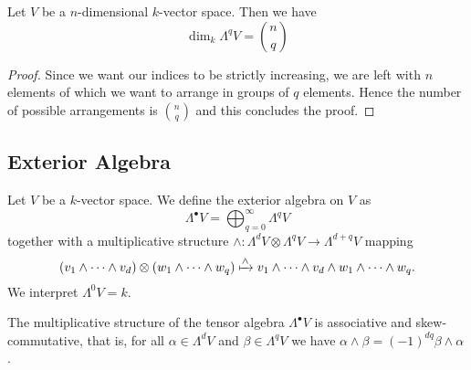 \begin{proposition}
  Let \(V\) be a \(n\)-dimensional \(k\)-vector space. Then we have
  \[
    \dim_k \Lambda^q V = \binom n q
  \]
\end{proposition}

\begin{proof}
  Since we want our indices to be strictly increasing, we are left with \(n\)
  elements of which we want to arrange in groups of \(q\) elements. Hence the
  number of possible arrangements is \(\binom n q\) and this concludes the
  proof.
\end{proof}

\subsection{Exterior Algebra}

\begin{definition}
  \label{def: exterior algebra}
  Let \(V\) be a \(k\)-vector space. We define the exterior algebra on \(V\) as
  \[
    \Lambda^\bullet V = \bigoplus_{q=0}^\infty \Lambda^q V
  \]
  together with a multiplicative structure \(\wedge: \Lambda^d V \otimes
  \Lambda^q V \to \Lambda^{d+q} V\) mapping
  \[
    (v_1 \wedge \dots \wedge v_d) \otimes (w_1 \wedge \dots \wedge w_q) \xmapsto
    \wedge v_1 \wedge \dots \wedge v_d \wedge w_1 \wedge \dots \wedge w_q.
  \]
  We interpret \(\Lambda^0 V = k\).
\end{definition}

\begin{proposition}
  The multiplicative structure of the tensor algebra \(\Lambda^\bullet V\) is
  associative and skew-commutative, that is, for all \(\alpha \in \Lambda^d V\)
  and \(\beta \in \Lambda^q V\) we have \(\alpha \wedge \beta = (-1)^{d q} \beta
  \wedge \alpha\).
\end{proposition}


